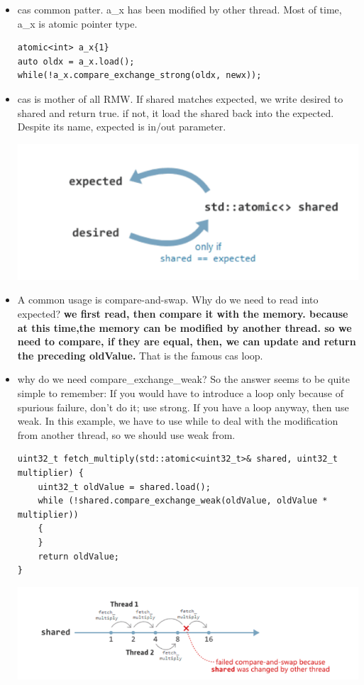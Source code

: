 \documentclass[a4paper,11pt,twoside]{book}
\begin{document}
\begin{itemize}
	\item cas common patter. a\_x has been modified by other thread. Most of time, a\_x is atomic pointer type.
\begin{lstlisting}[numbers=none]
atomic<int> a_x{1}
auto oldx = a_x.load();
while(!a_x.compare_exchange_strong(oldx, newx));
\end{lstlisting}
	
		\item cas is mother of all RMW. If shared matches expected, we write desired to shared and return true. if not, it load the shared back into the expected. Despite its name, expected is in/out parameter. 

\begin{center}
	\includegraphics[width=0.65\linewidth]{pics/cas.png}
\end{center}


		\item A common usage is compare-and-swap. Why do we need to read into expected? \textbf{we first read, then compare it with the memory. because at this time,the memory can be modified by another thread. so we need to compare, if they are equal, then, we can update and return the preceding oldValue.} That is the famous cas loop. 

		\item why do we need compare\_exchange\_weak?  So the answer seems to be quite simple to remember: If you would have to introduce a loop only because of spurious failure, don't do it; use strong. If you have a loop anyway, then use weak. In this example, we have to use while to deal with the modification from another thread, so we should use weak from.


\begin{lstlisting}
uint32_t fetch_multiply(std::atomic<uint32_t>& shared, uint32_t multiplier) {
    uint32_t oldValue = shared.load();
    while (!shared.compare_exchange_weak(oldValue, oldValue * multiplier))
    {
    }
    return oldValue;
}
\end{lstlisting}

\begin{center}
	\includegraphics[width=0.65\linewidth]{pics/cas1.png}
\end{center}


\end{itemize}
\end{document}
